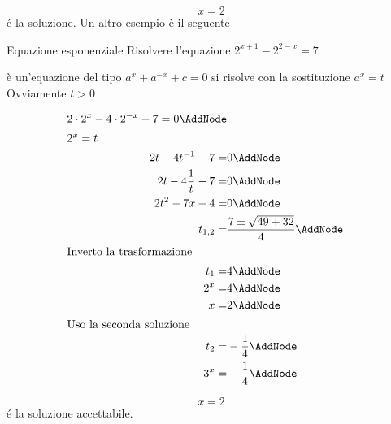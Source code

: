	\[x=2\]
	\'{e} la soluzione.
Un altro esempio è il seguente
\begin{esempiot}{Equazione esponenziale}{}
	Risolvere l'equazione $ 2^{x+1}-2^{2-x}=7$ 
\end{esempiot}
	è un'equazione del tipo $a^{x}+a^{-x}+c=0$ si risolve con la sostituzione $a^{x}=t$
	Ovviamente $t>0$ 
	\begin{NodesList}%
		\begin{align*}
			 2\cdot 2^{x}-4\cdot 2^{-x}-7=0\AddNode\\
			 \intertext{\hfil $2^x=t$}
			2t-4t^{-1}-7=&0\AddNode\\
			2t-4\dfrac{1}{t}-7=&0\AddNode\\
			2t^2-7x-4=&0\AddNode\\
			t_{1,2}=&\dfrac{7\pm\sqrt{49+32}}{4}\AddNode\\
			\intertext{\hfil Inverto la trasformazione}
			t_{1}=&4\AddNode\\
			2^{x}=&4\AddNode\\
			x=&2\AddNode\\
			\intertext{\hfil Uso la seconda soluzione}
			t_{2}=&-\dfrac{1}{4} \AddNode\\
			3^x=&-\dfrac{1}{4}\AddNode
		\end{align*}
		\LinkNodes{}%
	\end{NodesList}
	\[x=2\]
	\'{e} la soluzione accettabile.
